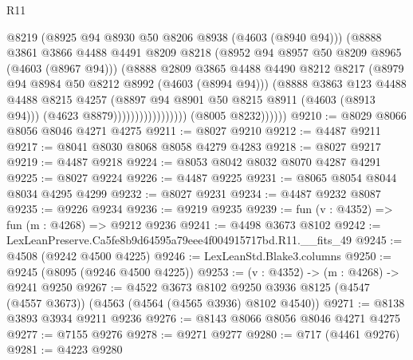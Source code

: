 \begin{lexlean}{R11}
\begin{coremodule}
                                        @8219
                                        (@8925 @94 @8930 @50 @8206 @8938 (@4603 (@8940 @94)))
                                        (@8888
                                          @3861
                                          @3866
                                          @4488
                                          @4491
                                          @8209
                                          @8218
                                          (@8952 @94 @8957 @50 @8209 @8965 (@4603 (@8967 @94)))
                                          (@8888
                                            @2809
                                            @3865
                                            @4488
                                            @4490
                                            @8212
                                            @8217
                                            (@8979 @94 @8984 @50 @8212 @8992 (@4603 (@8994 @94)))
                                            (@8888
                                              @3863
                                              @123
                                              @4488
                                              @4488
                                              @8215
                                              @4257
                                              (@8897 @94 @8901 @50 @8215 @8911 (@4603 (@8913 @94)))
                                              (@4623 @8879)))))))))))))))))
              (@8005 @8232))))))
@9210 := @8029 @8066 @8056 @8046 @4271 @4275
@9211 := @8027 @9210
@9212 := @4487 @9211
@9217 := @8041 @8030 @8068 @8058 @4279 @4283
@9218 := @8027 @9217
@9219 := @4487 @9218
@9224 := @8053 @8042 @8032 @8070 @4287 @4291
@9225 := @8027 @9224
@9226 := @4487 @9225
@9231 := @8065 @8054 @8044 @8034 @4295 @4299
@9232 := @8027 @9231
@9234 := @4487 @9232 @8087
@9235 := @9226 @9234
@9236 := @9219 @9235
@9239 := fun (v : @4352) => fun (m : @4268) => @9212 @9236
@9241 := @4498 @3673 @8102
@9242 := LexLeanPreserve.Ca5fe8b9d64595a79eee4f004915717bd.R11.__fits_49
@9245 := @4508 (@9242 @4500 @4225)
@9246 := LexLeanStd.Blake3.columns
@9250 := @9245 (@8095 (@9246 @4500 @4225))
@9253 := (v : @4352) -> (m : @4268) -> @9241 @9250
@9267 := @4522
    @3673
    @8102
    @9250
    @3936
    @8125
    (@4547 (@4557 @3673))
    (@4563 (@4564 (@4565 @3936) @8102 @4540))
@9271 := @8138 @3893 @3934 @9211 @9236
@9276 := @8143 @8066 @8056 @8046 @4271 @4275
@9277 := @7155 @9276
@9278 := @9271 @9277
@9280 := @717 (@4461 @9276)
@9281 := @4223 @9280

\end{coremodule}
\end{lexlean}
